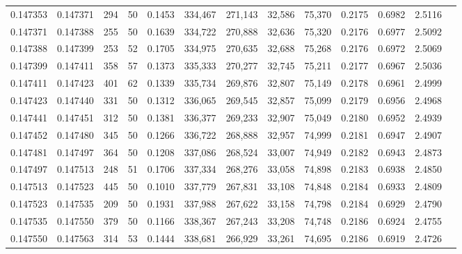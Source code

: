 \begin{tabular}{rrrrrrrrrrrrr}
0.147353 & 0.147371 &   294 &  50 &                                     0.1453 & 334,467 & 271,143 &  32,586 &  75,370 & 0.2175 & 0.6982 & 2.5116 \\
0.147371 & 0.147388 &   255 &  50 &                                     0.1639 & 334,722 & 270,888 &  32,636 &  75,320 & 0.2176 & 0.6977 & 2.5092 \\
0.147388 & 0.147399 &   253 &  52 &                                     0.1705 & 334,975 & 270,635 &  32,688 &  75,268 & 0.2176 & 0.6972 & 2.5069 \\
0.147399 & 0.147411 &   358 &  57 &                                     0.1373 & 335,333 & 270,277 &  32,745 &  75,211 & 0.2177 & 0.6967 & 2.5036 \\
0.147411 & 0.147423 &   401 &  62 &                                     0.1339 & 335,734 & 269,876 &  32,807 &  75,149 & 0.2178 & 0.6961 & 2.4999 \\
0.147423 & 0.147440 &   331 &  50 &                                     0.1312 & 336,065 & 269,545 &  32,857 &  75,099 & 0.2179 & 0.6956 & 2.4968 \\
0.147441 & 0.147451 &   312 &  50 &                                     0.1381 & 336,377 & 269,233 &  32,907 &  75,049 & 0.2180 & 0.6952 & 2.4939 \\
0.147452 & 0.147480 &   345 &  50 &                                     0.1266 & 336,722 & 268,888 &  32,957 &  74,999 & 0.2181 & 0.6947 & 2.4907 \\
0.147481 & 0.147497 &   364 &  50 &                                     0.1208 & 337,086 & 268,524 &  33,007 &  74,949 & 0.2182 & 0.6943 & 2.4873 \\
0.147497 & 0.147513 &   248 &  51 &                                     0.1706 & 337,334 & 268,276 &  33,058 &  74,898 & 0.2183 & 0.6938 & 2.4850 \\
0.147513 & 0.147523 &   445 &  50 &                                     0.1010 & 337,779 & 267,831 &  33,108 &  74,848 & 0.2184 & 0.6933 & 2.4809 \\
0.147523 & 0.147535 &   209 &  50 &                                     0.1931 & 337,988 & 267,622 &  33,158 &  74,798 & 0.2184 & 0.6929 & 2.4790 \\
0.147535 & 0.147550 &   379 &  50 &                                     0.1166 & 338,367 & 267,243 &  33,208 &  74,748 & 0.2186 & 0.6924 & 2.4755 \\
0.147550 & 0.147563 &   314 &  53 &                                     0.1444 & 338,681 & 266,929 &  33,261 &  74,695 & 0.2186 & 0.6919 & 2.4726 \\

\end{tabular}

